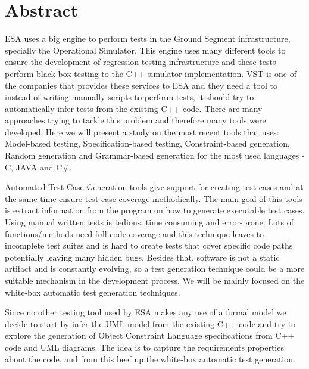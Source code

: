 \cleardoublepage
\chapter*{Abstract}
\ac{ESA} uses a big engine to perform tests in the
Ground Segment infrastructure, specially the Operational Simulator.
This engine uses many different tools to ensure the development of
regression testing infrastructure and these tests perform black-box
testing to the C++ simulator implementation.
\ac{VST} is one of the companies that provides
these services to \ac{ESA} and they need a tool to instead of writing
manually scripts to perform tests, it should try to automatically
infer tests from the existing C++ code.
There are many approaches trying to tackle this problem and therefore
many tools were developed. Here we will present a study on the most
recent tools that uses: Model-based testing, Specification-based
testing, Constraint-based generation, Random generation and
Grammar-based generation for the most used languages - C, JAVA and C\#.

Automated Test Case Generation tools give support for creating test
cases and at the same time ensure test case coverage methodically. The
main goal of this tools is extract information from the program on how
to generate executable test cases.
Using manual written tests is tedious, time consuming and error-prone.
Lots of functions/methods need full code coverage and this technique
leaves to incomplete test suites and is hard to create tests that
cover specific code paths potentially leaving many hidden bugs.
Besides that, software is not a static artifact and is constantly
evolving, so a test generation technique could be a more suitable
mechanism in the development process.
We will be mainly focused on the white-box automatic test generation techniques.

Since no other testing tool used by \ac{ESA} makes any use of a formal
model we decide to start by infer the \ac{UML} model from the existing C++
code and try to explore the generation of Object Constraint Language specifications
from C++ code and \ac{UML} diagrams. The idea is to capture the requirements properties about the code, and from this beef up the white-box automatic test generation.

